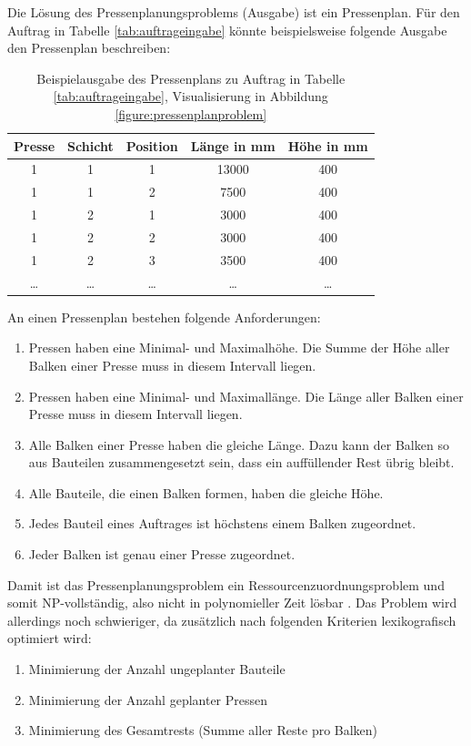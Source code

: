 Die Lösung des Pressenplanungsproblems (Ausgabe) ist ein Pressenplan.
Für den Auftrag in Tabelle \ref{tab:auftrageingabe} könnte beispielsweise folgende Ausgabe den Pressenplan beschreiben:

\begin{table}[H]
    \centering
    \begin{tabular}{|c|c|c|c|c|}
        \hline
        \textbf{Presse} & \textbf{Schicht} & \textbf{Position} & \textbf{Länge in mm} & \textbf{Höhe in mm} \\
        \hline
        1 & 1 & 1 & 13000 & 400 \\
        1 & 1 & 2 & 7500 & 400 \\
        1 & 2 & 1 & 3000 & 400 \\
        1 & 2 & 2 & 3000 & 400 \\
        1 & 2 & 3 & 3500 & 400 \\
        \ldots & \ldots & \ldots & \ldots & \ldots \\
        \hline
    \end{tabular}
    \caption{Beispielausgabe des Pressenplans zu Auftrag in Tabelle \ref{tab:auftrageingabe}, Visualisierung in Abbildung \ref{figure:pressenplanproblem}}
    \label{tab:auftragausgabe}
\end{table}

An einen Pressenplan bestehen folgende Anforderungen:
\begin{enumerate}
    \item Pressen haben eine Minimal- und Maximalhöhe. Die Summe der Höhe aller Balken einer Presse muss in diesem Intervall liegen.
    \item Pressen haben eine Minimal- und Maximallänge. Die Länge aller Balken einer Presse muss in diesem Intervall liegen.
    \item Alle Balken einer Presse haben die gleiche Länge. Dazu kann der Balken so aus Bauteilen zusammengesetzt sein, dass ein auffüllender Rest übrig bleibt.
    \item Alle Bauteile, die einen Balken formen, haben die gleiche Höhe.
    \item Jedes Bauteil eines Auftrages ist höchstens einem Balken zugeordnet.
    \item Jeder Balken ist genau einer Presse zugeordnet.
\end{enumerate}
Damit ist das Pressenplanungsproblem ein Ressourcenzuordnungsproblem und somit NP-vollständig, also nicht in polynomieller Zeit lösbar \cite{rcpspnp}.
Das Problem wird allerdings noch schwieriger, da zusätzlich nach folgenden Kriterien lexikografisch optimiert wird:
\begin{enumerate}
    \item Minimierung der Anzahl ungeplanter Bauteile
    \item Minimierung der Anzahl geplanter Pressen
    \item Minimierung des Gesamtrests (Summe aller Reste pro Balken)
\end{enumerate}

